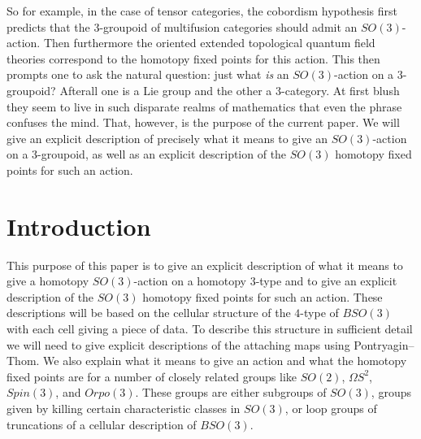 \documentclass{amsart}
\begin{document}
So for example, in the case of tensor categories, the cobordism hypothesis first predicts that the 3-groupoid of multifusion categories should admit an $SO(3)$-action. Then furthermore the oriented extended topological quantum field theories correspond to the homotopy fixed points for this action. This then prompts one to ask the natural question: just what \emph{is} an $SO(3)$-action on a 3-groupoid? Afterall one is a Lie group and the other a 3-category. At first blush they seem to live in such disparate realms of mathematics that even the phrase confuses the mind.
That, however, is the purpose of the current paper. We will give an explicit description of precisely what it means to give an $SO(3)$-action on a 3-groupoid, as well as an explicit description of the $SO(3)$ homotopy fixed points for such an action.




 


\section{Introduction}

This purpose of this paper is to give an explicit description of what it means to give a homotopy $SO(3)$-action on a homotopy 3-type and to give an explicit description of the $SO(3)$ homotopy fixed points for such an action.  These descriptions will be based on the cellular structure of the $4$-type of $BSO(3)$ with each cell giving a piece of data.  To describe this structure in sufficient detail we will need to give explicit descriptions of the attaching maps using Pontryagin--Thom.  We also explain what it means to give an action and what the homotopy fixed points are for a number of closely related groups like $SO(2)$, $\Omega S^2$, $Spin(3)$, and $Orpo(3)$.  These groups are either subgroups of $SO(3)$, groups given by killing certain characteristic classes in $SO(3)$, or loop groups of truncations of a cellular description of $BSO(3)$.
\end{document}
